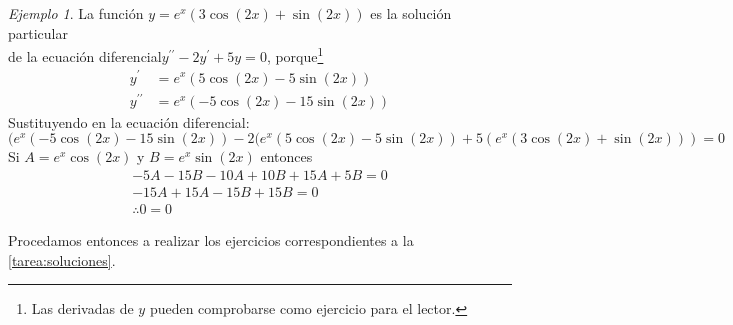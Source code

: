 \documentclass[12pt]{article} %
\theoremstyle{remark} %
\newcounter{ejercicio}[tarea]
\newtheorem{ejemplo}{Ejemplo}[section]
\newcommand{\ed}{ecuación diferencial}
\begin{document}
\begin{ejemplo}
  La función $y = e^x (3 \cos (2x) + \sin (2x))$ es la solución particular \\
  de la \ed $y^{\prime \prime} - 2y^{\prime} + 5y = 0$, 
  porque\footnote{Las derivadas de $y$ pueden comprobarse como ejercicio para el lector.}
  \begin{align*}
    y^{\prime} &= e^x (5 \cos (2x) - 5 \sin (2x)) \\[0.5em]
    y^{\prime \prime} &= e^x (-5 \cos (2x) - 15 \sin (2x))
  \end{align*}
  Sustituyendo en la \ed :
  \[(e^x(-5 \cos (2x) -15 \sin (2x)) - 2(e^x(5 \cos (2x) -5 \sin (2x)) 
  +5(e^x(3 \cos (2x) + \sin (2x))) = 0\]
  Si $A = e^x \cos(2x)$ y $B = e^x \sin(2x)$ entonces
  \begin{gather*}
    -5A - 15B -10A + 10B +15A + 5B = 0\\
    -15A + 15A -15B + 15 B = 0\\
    \therefore 0 = 0
  \end{gather*}
\end{ejemplo}

Procedamos entonces a realizar los ejercicios correspondientes a la \cref{tarea:soluciones}.
\end{document}
